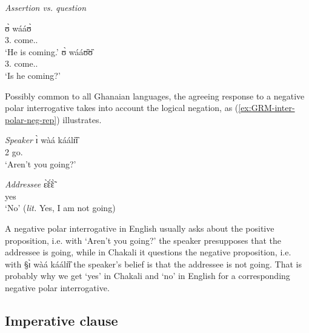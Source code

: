 \begin{exe}
 \ex\label{ex:GRM-inter-polar}{\it Assertion vs. question}
\begin{xlist}
\begin{multicols}{2}
\ex 
\gll ʊ̀ wááʊ̀\\
{3.\sg} come.{\ipfv .\foc}\\
\glt  `He is coming.'
\ex 
\gll ʊ̀ wááʊ̏ʊ̏ \\
{3.\sg} come.{\ipfv .\foc}\\
\glt `Is he coming?'%
\end{multicols}
\end{xlist}
\end{exe}


Possibly common to all Ghanaian languages, the  agreeing response
to a  negative polar interrogative
  takes into account the logical negation, as 
(\ref{ex:GRM-inter-polar-neg-rep}) illustrates. 



\begin{exe}
 \ex\label{ex:GRM-inter-polar-neg-rep}
\begin{xlist}
\begin{multicols}{2}
\ex\label{ex:GRM-inter-polar-neg-rep-S}{\it Speaker}
\gll  ɪ̀ wàá káálɪ̏ɪ̏\\
{2\sg} {\neg} go.{\q}\\
\glt `Aren't you going?'

\ex\label{ex:GRM-inter-polar-neg-rep-A}{\it Addressee}
\gll ɛ̃̀ɛ̃́ɛ̃̀\\
yes\\
\glt `No' ({\it lit.} Yes, I am not going)
\end{multicols}
\end{xlist}
\end{exe}

A negative polar interrogative in English usually asks about the
positive proposition, i.e. with `Aren't you going?' the speaker presupposes 
  that the addressee is going,   while in Chakali it questions the
negative proposition, i.e. with {\S  ɪ̀ wàá káálɪ̏ɪ̏} the speaker's belief
is that the addressee is not going. That is probably why we get `yes' in Chakali
and `no' in English for a corresponding negative polar interrogative.



\subsection{Imperative clause}
\label{sec:GRM-imper-clause}


